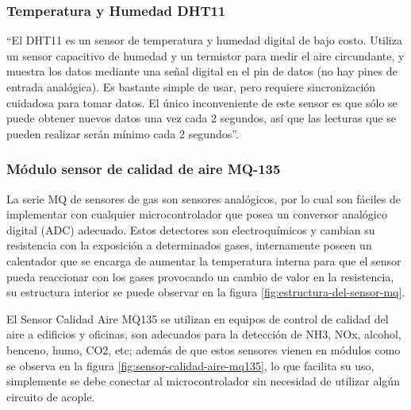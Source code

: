 \subsubsection{Temperatura y Humedad DHT11}

``El DHT11 es un sensor de temperatura y humedad digital de bajo costo. Utiliza un sensor capacitivo de humedad y un termistor para medir el aire circundante, y muestra los datos mediante una señal digital en el pin de datos (no hay pines de entrada analógica). Es bastante simple de usar, pero requiere sincronización cuidadosa para tomar datos. El único inconveniente de este sensor es que sólo se puede obtener nuevos datos una vez cada 2 segundos, así que las lecturas que se pueden realizar serán mínimo cada 2 segundos''. \cite{DHT11}



\subsubsection{Módulo sensor de calidad de aire MQ-135}

La serie MQ de sensores de gas son sensores analógicos, por lo cual son fáciles de implementar con cualquier microcontrolador que posea un conversor analógico digital (ADC) adecuado. Estos detectores son electroquímicos y cambian su resistencia con la exposición a determinados gases, internamente poseen un calentador que se encarga de aumentar la temperatura interna para que el sensor pueda reaccionar con los gases provocando un cambio de valor en la resistencia, su estructura interior se puede observar en la figura \ref{fig:estructura-del-sensor-mq}.\cite{MQ1}


El Sensor Calidad Aire MQ135 se utilizan en equipos de control de calidad del aire a edificios y oficinas, son adecuados para la detección de NH3, NOx, alcohol, benceno, humo, CO2, etc; además de que estos sensores vienen en módulos como se observa en la figura \ref{fig:sensor-calidad-aire-mq135}, lo que facilita su uso, simplemente se debe conectar al microcontrolador sin necesidad de utilizar algún circuito de acople. \cite{MQ1}

